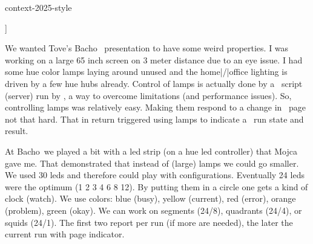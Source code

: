 
\environment context-2025-style


\setuptyping
  [style=\switchtobodyfont[7pt,tt]]


\setupbackgrounds
  [text]
  [background=extratext]


\setuptyping
  [align=hangright,
   keeptogether=paragraph,
   numbering=]

\startdocument
  [title={Signals},
   banner={Willi, Mojca & Hans},
   location={context\enspace{\bf 2025}\enspace meeting}]

\starttitle[title=From beamer to lamps]

\startitemize
\startitem
    We wanted Tove's Bacho\TEX\  presentation to have some weird
    properties.
\stopitem
\startitem
    I was working on a large 65 inch screen on 3 meter distance due to an eye
    issue.
\stopitem
\startitem
    I had some hue color lamps laying around unused and the home|/|office lighting
    is driven by a few hue hubs already.
\stopitem
\startitem
    Control of lamps is actually done by a \LUA\ script (server) run by \LUATEX,
    a way to overcome limitations (and performance issues).
\stopitem
\startitem
    So, controlling lamps was relatively easy. Making them respond to a change in
    \PDF\ page not that hard.
\stopitem
\startitem
    That in return triggered using lamps to indicate a \CONTEXT\ run state and
    result.
\stopitem
\stopitemize

\stoptitle

\starttitle[title=From lamps to leds]

\startitemize
\startitem
    At Bacho\TEX\ we played a bit with a led strip (on a hue led controller)
    that Mojca gave me.
\stopitem
\startitem
    That demonstrated that instead of (large) lamps we could go smaller.
\stopitem
\startitem
    We used 30 leds and therefore could play with configurations. Eventually
    24 leds were the optimum (1 2 3 4 6 8 12).
\stopitem
\startitem
    By putting them in a circle one gets a kind of clock (watch).
\stopitem
\startitem
    We use colors: blue (busy), yellow (current), red (error), orange (problem),
    green (okay).
\stopitem
\startitem
    We can work on segments (24/8), quadrants (24/4), or squids (24/1). The first
    two report per run (if more are needed), the later the current run with page
    indicator.
\stopitem
\stopitemize

